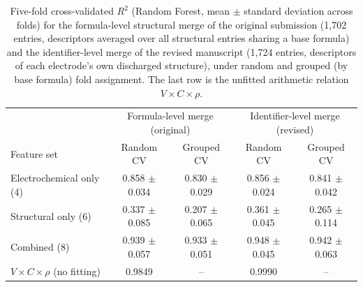 \documentclass[10pt]{article}
\begin{document}
\begin{table}[htbp]
\centering
\caption{Five-fold cross-validated $R^2$ (Random Forest, mean $\pm$ standard deviation across folds) for the formula-level structural merge of the original submission (1,702 entries, descriptors averaged over all structural entries sharing a base formula) and the identifier-level merge of the revised manuscript (1,724 entries, descriptors of each electrode's own discharged structure), under random and grouped (by base formula) fold assignment. The last row is the unfitted arithmetic relation $V\times C\times\rho$.}
\label{tab:s5_merge}
\setlength{\tabcolsep}{5pt}
\renewcommand{\arraystretch}{1.25}
\small
\begin{tabular}{l c c c c}
\hline
 & \multicolumn{2}{c}{Formula-level merge (original)} & \multicolumn{2}{c}{Identifier-level merge (revised)} \\
Feature set & Random CV & Grouped CV & Random CV & Grouped CV \\
\hline
Electrochemical only (4) & 0.858 $\pm$ 0.034 & 0.830 $\pm$ 0.029 & 0.856 $\pm$ 0.024 & 0.841 $\pm$ 0.042 \\
Structural only (6) & 0.337 $\pm$ 0.085 & 0.207 $\pm$ 0.065 & 0.361 $\pm$ 0.045 & 0.265 $\pm$ 0.114 \\
Combined (8) & 0.939 $\pm$ 0.057 & 0.933 $\pm$ 0.051 & 0.948 $\pm$ 0.045 & 0.942 $\pm$ 0.063 \\
$V\times C\times\rho$ (no fitting) & 0.9849 & -- & 0.9990 & -- \\
\hline
\end{tabular}
\end{table}



\end{document}
